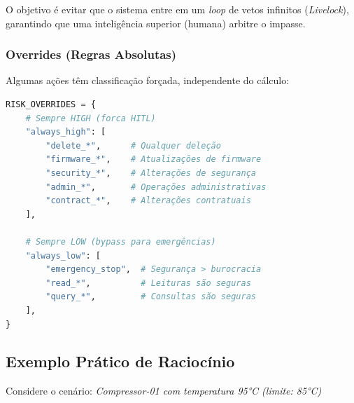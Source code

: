 \documentclass[12pt, a4paper]{article}
\begin{document}
O objetivo é evitar que o sistema entre em um \textit{loop} de vetos infinitos (\textit{Livelock}), garantindo que uma inteligência superior (humana) arbitre o impasse.

\subsubsection{Overrides (Regras Absolutas)}

Algumas ações têm classificação forçada, independente do cálculo:

\begin{lstlisting}[language=Python, caption=Regras de Override de Risco, basicstyle=\tiny\ttfamily]
RISK_OVERRIDES = {
    # Sempre HIGH (forca HITL)
    "always_high": [
        "delete_*",      # Qualquer deleção
        "firmware_*",    # Atualizações de firmware
        "security_*",    # Alterações de segurança
        "admin_*",       # Operações administrativas
        "contract_*",    # Alterações contratuais
    ],
    
    # Sempre LOW (bypass para emergências)
    "always_low": [
        "emergency_stop",  # Segurança > burocracia
        "read_*",          # Leituras são seguras
        "query_*",         # Consultas são seguras
    ],
}
\end{lstlisting}

\subsection{Exemplo Prático de Raciocínio}

Considere o cenário: \textit{Compressor-01 com temperatura 95°C (limite: 85°C)}
\end{document}
